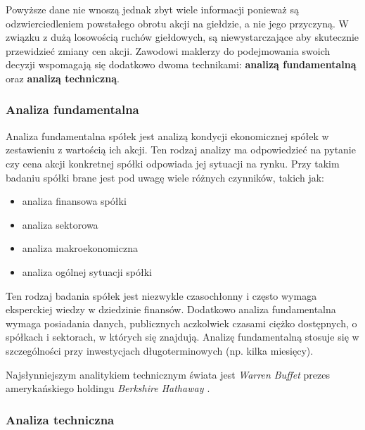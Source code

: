 \documentclass[a4paper, twoside, 11pt, openright]{article}
\begin{document}
\bigskip

Powyższe dane nie wnoszą jednak zbyt wiele informacji ponieważ są odzwierciedleniem powstałego obrotu akcji na giełdzie, a nie jego przyczyną. W związku z dużą losowością ruchów giełdowych, są niewystarczające aby skutecznie przewidzieć zmiany cen akcji. Zawodowi maklerzy do podejmowania swoich decyzji wspomagają się dodatkowo dwoma technikami: \textbf{analizą fundamentalną} oraz \textbf{analizą techniczną}.

\subsubsection{Analiza fundamentalna \cite{fundamentalanalysis}}

Analiza fundamentalna spółek jest analizą kondycji ekonomicznej spółek w zestawieniu z wartością ich akcji. Ten rodzaj analizy ma odpowiedzieć na pytanie czy cena akcji konkretnej spółki odpowiada jej sytuacji na rynku. Przy takim badaniu spółki brane jest pod uwagę wiele różnych czynników, takich jak:
\begin{itemize}
\item{analiza finansowa spółki}
\item{analiza sektorowa}
\item{analiza makroekonomiczna}
\item{analiza ogólnej sytuacji spółki}
\end{itemize}

Ten rodzaj badania spółek jest niezwykle czasochłonny i często wymaga eksperckiej wiedzy w dziedzinie finansów. Dodatkowo analiza fundamentalna wymaga posiadania danych, publicznych aczkolwiek czasami ciężko dostępnych, o spółkach i sektorach, w których się znajdują. Analizę fundamentalną stosuje się w szczególności przy inwestycjach długoterminowych (np. kilka miesięcy).

Najsłynniejszym analitykiem technicznym świata jest \textit{Warren Buffet} prezes amerykańskiego holdingu \textit{Berkshire Hathaway \cite{berkeshire}}. 

\subsubsection{Analiza techniczna \cite{technicalanalysis}}
\end{document}
